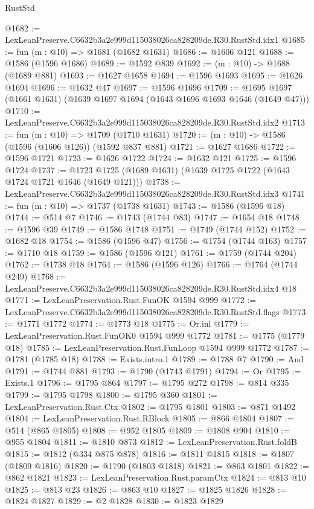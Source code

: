 \begin{lexlean}{RustStd}
\begin{coremodule}
@1682 := LexLeanPreserve.C6632b3a2e999d115038026ca828209de.R30.RustStd.idx1
@1685 := fun (m : @10) => @1681 (@1682 @1631)
@1686 := @1606 @121
@1688 := @1586 (@1596 @1686)
@1689 := @1592 @839
@1692 := (m : @10) -> @1688 (@1689 @881)
@1693 := @1627 @1658
@1694 := @1596 @1693
@1695 := @1626 @1694
@1696 := @1632 @47
@1697 := @1596 @1696
@1709 := @1695 @1697 (@1661 @1631) (@1639 @1697 @1694 (@1643 @1696 @1693 @1646 (@1649 @47)))
@1710 := LexLeanPreserve.C6632b3a2e999d115038026ca828209de.R30.RustStd.idx2
@1713 := fun (m : @10) => @1709 (@1710 @1631)
@1720 := (m : @10) -> @1586 (@1596 (@1606 @126)) (@1592 @837 @881)
@1721 := @1627 @1686
@1722 := @1596 @1721
@1723 := @1626 @1722
@1724 := @1632 @121
@1725 := @1596 @1724
@1737 := @1723 @1725 (@1689 @1631) (@1639 @1725 @1722 (@1643 @1724 @1721 @1646 (@1649 @121)))
@1738 := LexLeanPreserve.C6632b3a2e999d115038026ca828209de.R30.RustStd.idx3
@1741 := fun (m : @10) => @1737 (@1738 @1631)
@1743 := @1586 (@1596 @18)
@1744 := @514 @7
@1746 := @1743 (@1744 @83)
@1747 := @1654 @18
@1748 := @1596 @39
@1749 := @1586 @1748
@1751 := @1749 (@1744 @152)
@1752 := @1682 @18
@1754 := @1586 (@1596 @47)
@1756 := @1754 (@1744 @163)
@1757 := @1710 @18
@1759 := @1586 (@1596 @121)
@1761 := @1759 (@1744 @204)
@1762 := @1738 @18
@1764 := @1586 (@1596 @126)
@1766 := @1764 (@1744 @249)
@1768 := LexLeanPreserve.C6632b3a2e999d115038026ca828209de.R30.RustStd.idx4 @18
@1771 := LexLeanPreservation.Rust.FunOK @1594 @999
@1772 := LexLeanPreserve.C6632b3a2e999d115038026ca828209de.R30.RustStd.flags
@1773 := @1771 @1772
@1774 := @1773 @18
@1775 := Or.inl
@1779 := LexLeanPreservation.Rust.FunOK0 @1594 @999 @1772
@1781 := @1775 (@1779 @18)
@1785 := LexLeanPreservation.Rust.FunLoop @1594 @999 @1772
@1787 := @1781 (@1785 @18)
@1788 := Exists.intro.{1}
@1789 := @1788 @7
@1790 := And
@1791 := @1744 @881
@1793 := @1790 (@1743 @1791)
@1794 := Or
@1795 := Exists.{1}
@1796 := @1795 @864
@1797 := @1795 @272
@1798 := @814 @335
@1799 := @1795 @1798
@1800 := @1795 @360
@1801 := LexLeanPreservation.Rust.Ctx
@1802 := @1795 @1801
@1803 := @871 @1492
@1804 := LexLeanPreservation.Rust.RBlock
@1805 := @866 @1804
@1807 := @514 (@865 @1805)
@1808 := @952 @1805
@1809 := @1808 @904
@1810 := @955 @1804
@1811 := @1810 @873
@1812 := LexLeanPreservation.Rust.foldB
@1815 := @1812 (@334 @875 @878)
@1816 := @1811 @1815
@1818 := @1807 (@1809 @1816)
@1820 := @1790 (@1803 @1818)
@1821 := @863 @1801
@1822 := @862 @1821
@1823 := LexLeanPreservation.Rust.paramCtx
@1824 := @813 @10
@1825 := @813 @23
@1826 := @863 @10
@1827 := @1825 @1826
@1828 := @1824 @1827
@1829 := @2 @1828
@1830 := @1823 @1829

\end{coremodule}
\end{lexlean}
